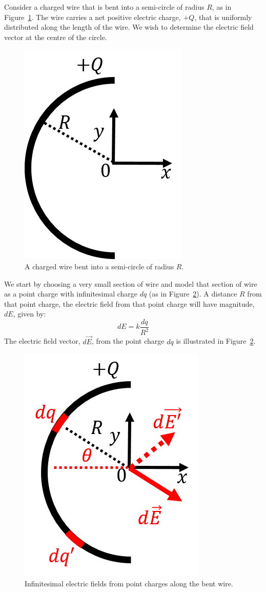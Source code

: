 Consider a charged wire that is bent into a semi-circle of radius $R$, as in Figure~\ref{fig:chargesfields:semicircle}. The wire carries a net positive electric charge, $+Q$, that is uniformly distributed along the length of the wire. We wish to determine the electric field vector at the centre of the circle.

\begin{figure}[!htbp]
\centering
\includegraphics[width=0.2\linewidth]{files/semicircle-90ec0efe2d9da30eb5c806e6cf98e1f5.png}
\caption[]{A charged wire bent into a semi-circle of radius $R$.}
\label{fig:chargesfields:semicircle}
\end{figure}

We start by choosing a very small section of wire and model that section of wire as a point charge with infinitesimal charge $dq$ (as in Figure~\ref{fig:chargesfields:semicircle_sol}). A distance $R$ from that point charge, the electric field from that point charge will have magnitude, $dE$, given by:
\begin{equation}
dE=k\frac{dq}{R^2}
\end{equation}
The electric field vector, $d\vec E$, from the point charge $dq$ is illustrated in Figure~\ref{fig:chargesfields:semicircle_sol}.

\begin{figure}[!htbp]
\centering
\includegraphics[width=0.2\linewidth]{files/semicircle_sol-cc72f82d349a967ff3aeacf8b69a4061.png}
\caption[]{Infinitesimal electric fields from point charges along the bent wire.}
\label{fig:chargesfields:semicircle_sol}
\end{figure}

